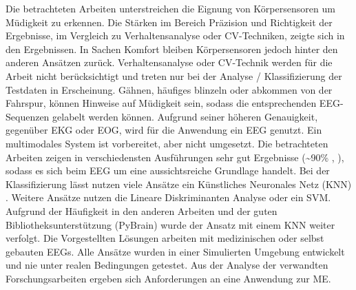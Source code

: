 Die betrachteten Arbeiten unterstreichen die Eignung von Körpersensoren  um Müdigkeit zu erkennen. Die Stärken im Bereich Präzision und Richtigkeit der Ergebnisse, im Vergleich zu Verhaltensanalyse oder CV-Techniken, zeigte sich in den Ergebnissen. In Sachen Komfort bleiben  Körpersensoren jedoch hinter den anderen Ansätzen zurück. Verhaltensanalyse oder CV-Technik werden für die Arbeit nicht berücksichtigt und treten nur bei der Analyse / Klassifizierung der Testdaten in Erscheinung. Gähnen, häufiges blinzeln oder abkommen von der Fahrspur, können Hinweise auf Müdigkeit sein, sodass die entsprechenden EEG-Sequenzen gelabelt werden können. 
Aufgrund seiner höheren Genauigkeit, gegenüber EKG oder EOG, wird für die Anwendung ein EEG genutzt. Ein multimodales System ist vorbereitet, aber nicht umgesetzt. Die betrachteten Arbeiten zeigen in verschiedensten Ausführungen sehr gut Ergebnisse (\textasciitilde 90\% \cite{Lin05eeg-baseddrowsiness}, \cite{Subasi:2005:ARA:1707423.1707550}), sodass es sich beim EEG um eine aussichtsreiche Grundlage handelt. 
Bei der Klassifizierung lässt nutzen viele Ansätze ein Künstliches Neuronales Netz (KNN)\cite{wilson_890161}\cite{khalifa_893852}\cite{Subasi:2005:ARA:1707423.1707550} \cite{Vuckovic2002349}. Weitere Ansätze nutzen die Lineare Diskriminanten Analyse\cite{Vicente_6164509}\cite{Khushaba_5580017} oder ein SVM\cite{Park:2009:DDD:1667780.1667798}\cite{zhang_6513058}. Aufgrund der Häufigkeit in den anderen Arbeiten und der guten Bibliotheksunterstützung (PyBrain) wurde der Ansatz mit einem KNN weiter verfolgt. Die Vorgestellten Lösungen arbeiten mit medizinischen oder selbst gebauten EEGs. Alle Ansätze wurden in einer Simulierten Umgebung entwickelt und nie unter realen Bedingungen getestet. Aus der Analyse der verwandten Forschungsarbeiten ergeben sich Anforderungen an eine Anwendung zur \acl{ME}. 